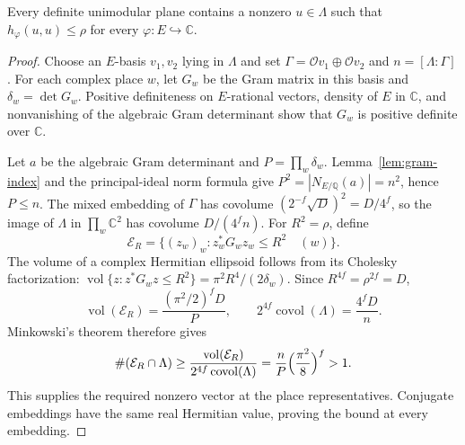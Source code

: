 \begin{lemma}\label{lem:short-all}
Every definite unimodular plane contains a nonzero $u\in\Lambda$ such that
$h_\varphi(u,u)\leq\rho$ for every $\varphi:E\hookrightarrow\mathbb C$.
\end{lemma}
\begin{proof}
Choose an $E$-basis $v_1,v_2$ lying in $\Lambda$ and set
$\Gamma=\mathcal O v_1\oplus\mathcal O v_2$ and $n=[\Lambda:\Gamma]$.
For each complex place $w$, let $G_w$ be the Gram matrix in this basis and
$\delta_w=\det G_w$. Positive definiteness on $E$-rational vectors, density of
$E$ in $\mathbb C$, and nonvanishing of the algebraic Gram determinant show
that $G_w$ is positive definite over $\mathbb C$.

Let $a$ be the algebraic Gram determinant and $P=\prod_w\delta_w$.
Lemma~\ref{lem:gram-index} and the principal-ideal norm formula give
$P^2=|N_{E/\mathbb Q}(a)|=n^2$, hence $P\leq n$. The mixed embedding of
$\Gamma$ has covolume $(2^{-f}\sqrt D)^2=D/4^f$, so the image of $\Lambda$
in $\prod_w\mathbb C^2$ has covolume $D/(4^fn)$. For $R^2=\rho$, define
\[
\mathcal E_R=\{(z_w)_w:z_w^*G_wz_w\leq R^2\quad(w)\}.
\]
The volume of a complex Hermitian ellipsoid follows from its Cholesky
factorization:
$\operatorname{vol}\{z:z^*G_wz\leq R^2\}=\pi^2R^4/(2\delta_w)$.
Since $R^{4f}=\rho^{2f}=D$,
\[
\operatorname{vol}(\mathcal E_R)=\frac{(\pi^2/2)^fD}{P},
\qquad 2^{4f}\operatorname{covol}(\Lambda)=\frac{4^fD}{n}.
\]
Minkowski's theorem therefore gives
\[
\#(\mathcal E_R\cap\Lambda)\geq
\frac{\operatorname{vol}(\mathcal E_R)}{2^{4f}\operatorname{covol}(\Lambda)}
=\frac nP\Bigl(\frac{\pi^2}{8}\Bigr)^f>1.
\]
This supplies the required nonzero vector at the place representatives.
Conjugate embeddings have the same real Hermitian value, proving the bound
at every embedding.
\end{proof}

